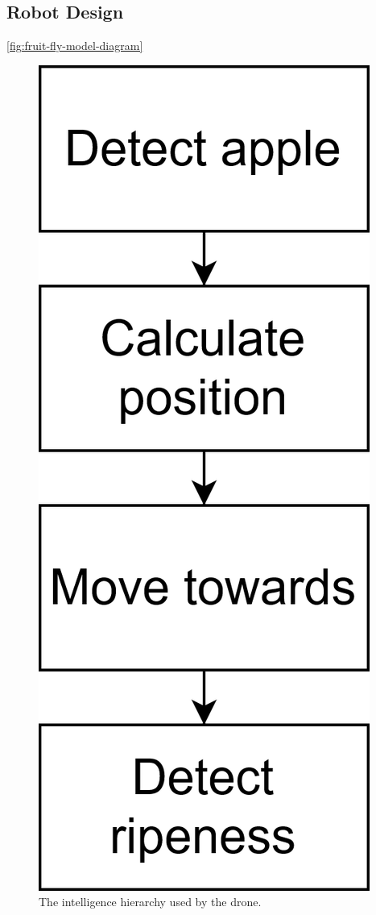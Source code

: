 \subsection{Robot Design}\label{subsec:robot-design}

\autoref{fig:fruit-fly-model-diagram}


\begin{figure}[htbp]
    \fontsize{7}{5}\selectfont
    \centering
    \includegraphics[maxwidth=\columnwidth,scale=0.75]
    {./figures/intelligence-hierarchy}
    \caption{
        The intelligence hierarchy used by the drone.
    }
    \label{fig:intelligence-hierarchy}
\end{figure}

